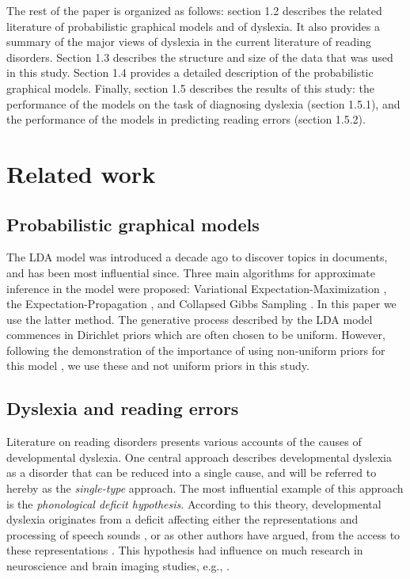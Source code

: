 The rest of the paper is organized as follows: section 1.2 describes the related literature of probabilistic graphical models and of dyslexia. It also provides a summary of the major views of dyslexia in the current literature of reading disorders. Section 1.3 describes the structure and size of the data that was used in this study. Section 1.4 provides a detailed description of the probabilistic graphical models. Finally, section 1.5 describes the results of this study: the performance of the models on the task of diagnosing dyslexia (section 1.5.1), and the performance of the models in predicting reading errors (section 1.5.2).


\section{Related work}
\subsection{Probabilistic graphical models}
The LDA model was introduced a decade ago to discover topics in documents, and has been most influential since. Three main algorithms for approximate inference in the model were proposed: Variational Expectation-Maximiz\-ation \citep{bnj03}, the Expectation-Propagation \citep{ml02}, and Collapsed Gibbs Sampling \citep{gs04}. In this paper we use the latter method. The generative process described by the LDA model commences in Dirichlet priors which are often chosen to be uniform. However, following the demonstration of the importance of using non-uniform priors for this model \citep{wmm09}, we use these and not uniform priors in this study.

\subsection{Dyslexia and reading errors}
Literature on reading disorders presents various accounts of the causes of developmental dyslexia. One central approach describes developmental dyslexia as a disorder that can be reduced into a single cause, and will be referred to hereby as the {\it single-type} approach. The most influential example of this approach is the {\it phonological deficit hypothesis}. According to this theory, developmental dyslexia originates from a deficit affecting either the representations and processing of speech sounds \citep{ss05, s00, s98}, or as other authors have argued, from the access to these representations \citep{rs08}. This hypothesis had influence on much research in neuroscience and brain imaging studies, e.g., \citep{bdvsgmg13, d09, vgpsh13, grggvfb02, r14, rrddcw03}.

